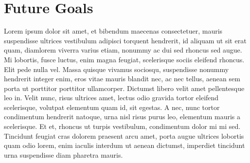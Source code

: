 \section*{Future Goals}

\begin{singlespace}
\im
Lorem ipsum dolor sit amet, et bibendum maecenas consectetuer, mauris suspendisse ultrices vestibulum adipisci torquent hendrerit, id aliquam ut sit erat quam, diamlorem viverra varius etiam, nonummy ac dui sed rhoncus sed augue.
Mi lobortis, fusce luctus, enim magna feugiat, scelerisque sociis eleifend rhoncus.
Elit pede nulla vel.
Massa quisque vivamus sociosqu, suspendisse nonummy hendrerit integer enim, eros vitae mauris blandit nec, ac nec tellus, aenean sem porta ut porttitor porttitor ullamcorper.
Dictumst libero velit amet pellentesque leo in.
Velit nunc, risus ultrices amet, lectus odio gravida tortor eleifend scelerisque, volutpat elementum quam id, sit egestas.
A nec, nunc tortor condimentum hendrerit natoque, urna nisl risus purus leo, elementum mauris a scelerisque.
Et et, rhoncus ut turpis vestibulum, condimentum dolor mi mi sed.
\bi
Tincidunt feugiat cras dolorem praesent arcu amet, porta augue ultrices lobortis quam odio lorem, enim iaculis interdum ut aenean dictumst, imperdiet tincidunt urna suspendisse diam pharetra mauris.
\end{singlespace}
